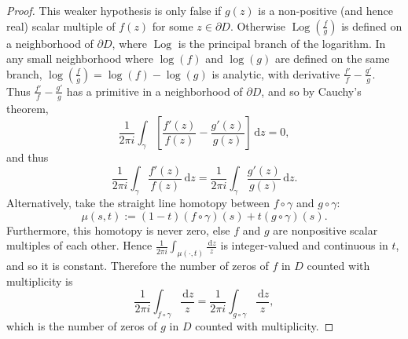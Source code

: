 \documentclass[12pt]{article}
\theoremstyle{definition}
\theoremstyle{remark}
\DeclareMathOperator\Log{Log}
\begin{document}
\begin{proof}
    This weaker hypothesis is only false if $g(z)$ is a non-positive (and hence real) scalar multiple of $f(z)$ for some $z\in\partial D$. Otherwise $\Log\left(\frac{f}{g}\right)$ is defined on a neighborhood of $\partial D$, where $\Log$ is the principal branch of the logarithm. In any small neighborhood where $\log(f)$ and $\log(g)$ are defined on the same branch, $\log\left(\frac{f}{g}\right)=\log(f)-\log(g)$ is analytic, with derivative $\frac{f'}{f}-\frac{g'}{g}$. Thus $\frac{f'}{f}-\frac{g'}{g}$ has a primitive in a neighborhood of $\partial D$, and so by Cauchy's theorem,
    \begin{equation}
        \frac{1}{2\pi i}\int_{\gamma}\left[\frac{f'(z)}{f(z)}-\frac{g'(z)}{g(z)}\right]\,\mathrm{d}z=0,
    \end{equation}
    and thus
    \begin{equation}
        \frac{1}{2\pi i}\int_{\gamma}\frac{f'(z)}{f(z)}\,\mathrm{d}z=\frac{1}{2\pi i}\int_{\gamma}\frac{g'(z)}{g(z)}\,\mathrm{d}z.
    \end{equation}
    Alternatively, take the straight line homotopy between $f\circ\gamma$ and $g\circ\gamma$:
    \begin{equation}
        \mu(s,t):=(1-t)(f\circ\gamma)(s)+t(g\circ\gamma)(s).
    \end{equation}
    Furthermore, this homotopy is never zero, else $f$ and $g$ are nonpositive scalar multiples of each other. Hence $\frac{1}{2\pi i}\int_{\mu(\cdot,t)}\frac{\,\mathrm{d}z}{z}$ is integer-valued and continuous in $t$, and so it is constant. Therefore the number of zeros of $f$ in $D$ counted with multiplicity is 
    \begin{equation}
        \frac{1}{2\pi i}\int_{f\circ\gamma}\frac{\,\mathrm{d}z}{z}=\frac{1}{2\pi i}\int_{g\circ\gamma}\frac{\,\mathrm{d}z}{z},
    \end{equation}
    which is the number of zeros of $g$ in $D$ counted with multiplicity.
\end{proof}
\end{document}
